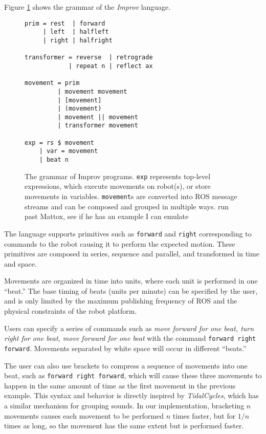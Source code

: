 \documentclass[sigconf]{acmart}
\begin{document}
Figure \ref{grammar} shows the grammar of the \emph{Improv} language.

\begin{figure}
\centering
\begin{verbatim}
prim = rest  | forward 
     | left  | halfleft
     | right | halfright

transformer = reverse  | retrograde 
            | repeat n | reflect ax

movement = prim
         | movement movement
         | [movement]
         | (movement)
         | movement || movement 
         | transformer movement

exp = rs $ movement
    | var = movement
    | beat n
\end{verbatim}
\caption{The grammar of Improv programs. \texttt{exp} represents top-level
expressions, which execute movements on robot(s), or store movements in
variables. \texttt{movement}s are converted into ROS message streams and can be
composed and grouped in multiple ways. {\color{red} run past Mattox, see if he
has an example I can emulate} \label{grammar}}

\end{figure}

The language supports primitives such as \texttt{forward} and \texttt{right}
corresponding to commands to the robot causing it to perform the expected
motion. These primitives are composed in series, sequence and parallel, and
transformed in time and space.

Movements are organized in time into units, where each unit is performed in one
``beat.'' The base timing of beats (units per minute) can be specified by the
user, and is only limited by the maximum publishing frequency of ROS and the
physical constraints of the robot platform.

Users can specify a series of commands such as \emph{move forward for
one beat, turn right for one beat, move forward for one beat} with the
command \texttt{forward right forward}. Movements separated by white
space will occur in different ``beats.''

The user can also use brackets to compress a sequence of movements into
one beat, such as \texttt{forward right forward}, which will
cause these three movements to happen in the same amount of time as the
first movement in the previous example. This syntax and behavior is directly 
inspired by \emph{TidalCycles}, which has a similar mechanism for grouping
sounds. In our implementation,
bracketing $n$ movements causes each movement to be performed $n$
times faster, but for $1/n$ times as long, so the movement has the
same extent but is performed faster.
\end{document}
